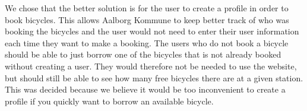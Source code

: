 We chose that the better solution is for the user to create a profile in order to book bicycles. 
This allows Aalborg Kommune to keep better track of who was booking the bicycles and the user would not need to enter their user information each time they want to make a booking.
The users who do not book a bicycle should be able to just borrow one of the bicycles that is not already booked without creating a user.
They would therefore not be needed to use the website, but should still be able to see how many free bicycles there are at a given station.
This was decided because we believe it would be too inconvenient to create a profile if you quickly want to borrow an available bicycle.